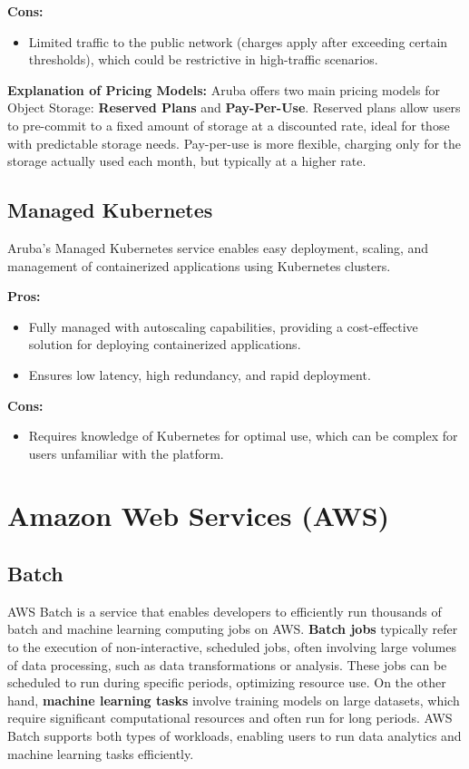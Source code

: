 \textbf{Cons:}
\begin{itemize}
    \item Limited traffic to the public network (charges apply after exceeding certain thresholds), which could be restrictive in high-traffic scenarios.
\end{itemize}

\textbf{Explanation of Pricing Models:}
Aruba offers two main pricing models for Object Storage: \textbf{Reserved Plans} and \textbf{Pay-Per-Use}. Reserved plans allow users to pre-commit to a fixed amount of storage at a discounted rate, ideal for those with predictable storage needs. Pay-per-use is more flexible, charging only for the storage actually used each month, but typically at a higher rate.


\subsection*{Managed Kubernetes}
Aruba's Managed Kubernetes service enables easy deployment, scaling, and management of containerized applications using Kubernetes clusters.

\textbf{Pros:}
\begin{itemize}
    \item Fully managed with autoscaling capabilities, providing a cost-effective solution for deploying containerized applications.
    \item Ensures low latency, high redundancy, and rapid deployment.
\end{itemize}

\textbf{Cons:}
\begin{itemize}
    \item Requires knowledge of Kubernetes for optimal use, which can be complex for users unfamiliar with the platform.
\end{itemize}


\section{Amazon Web Services (AWS)}
\label{aws}

\subsection*{Batch}
\label{aws:batch}
AWS Batch is a service that enables developers to efficiently run thousands of batch and machine learning computing jobs on AWS.
\textbf{Batch jobs} typically refer to the execution of non-interactive, scheduled jobs, often involving large volumes of data processing, such as data transformations or analysis. These jobs can be scheduled to run during specific periods, optimizing resource use. On the other hand, \textbf{machine learning tasks} involve training models on large datasets, which require significant computational resources and often run for long periods. AWS Batch supports both types of workloads, enabling users to run data analytics and machine learning tasks efficiently.



